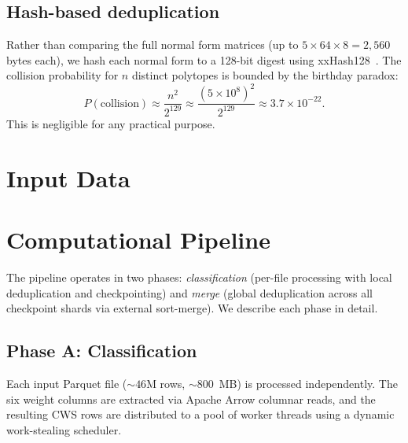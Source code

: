 \documentclass[12pt,a4paper]{article}
\theoremstyle{definition}
\begin{document}
\subsection{Hash-based deduplication}

Rather than comparing the full normal form matrices (up to $5 \times 64
\times 8 = 2{,}560$ bytes each), we hash each normal form to a 128-bit
digest using xxHash128~\cite{xxHash}.  The collision probability for
$n$ distinct polytopes is bounded by the birthday paradox:
\[
  P(\text{collision}) \approx \frac{n^2}{2^{129}} \approx
  \frac{(5 \times 10^8)^2}{2^{129}} \approx 3.7 \times 10^{-22}.
\]
This is negligible for any practical purpose.



\section{Input Data}
\label{sec:data}


\section{Computational Pipeline}
\label{sec:pipeline}

The pipeline operates in two phases: \emph{classification} (per-file
processing with local deduplication and checkpointing) and \emph{merge}
(global deduplication across all checkpoint shards via external
sort-merge).  We describe each phase in detail.

\subsection{Phase A: Classification}
\label{sec:classification}

Each input Parquet file ($\sim 46$M rows, $\sim 800$~MB) is processed
independently.  The six weight columns are extracted via Apache Arrow
columnar reads, and the resulting CWS rows are distributed to a pool
of worker threads using a dynamic work-stealing scheduler.
\end{document}
